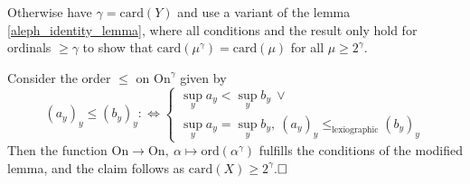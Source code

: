 \documentclass{scrartcl}
\begin{document}
Otherwise have $\gamma = \mathrm{card}(Y)$ and use a variant of the lemma \ref{aleph_identity_lemma}, where all conditions and the result only hold for ordinals $\geq \gamma$ to show that $\mathrm{card}(\mu^\gamma) = \mathrm{card}(\mu)$ for all $\mu \geq 2^\gamma$.

Consider the order $\leq$ on $\mathrm{On}^\gamma$ given by
\begin{equation*}
    (a_y)_y \leq (b_y)_y :\Leftrightarrow \begin{cases} \sup_y a_y < \sup_y b_y \ \vee \\ \sup_y a_y = \sup_y b_y, \ (a_y)_y \leq_{\text{lexiographic}} (b_y)_y \end{cases}
\end{equation*}
Then the function $\mathrm{On} \to \mathrm{On}, \ \alpha \mapsto \mathrm{ord}(\alpha^\gamma)$ fulfills the conditions of the modified lemma, and the claim follows as $\mathrm{card}(X) \geq 2^\gamma$.$\hfill\square$
\end{document}
